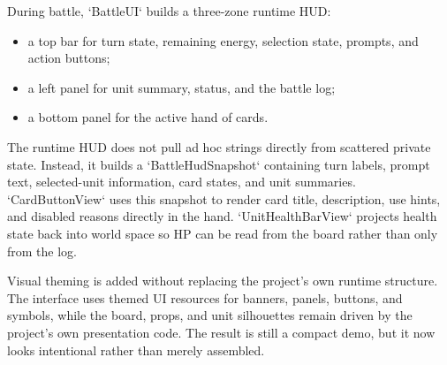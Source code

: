 During battle, `BattleUI` builds a three-zone runtime HUD:

\begin{itemize}
    \item a top bar for turn state, remaining energy, selection state, prompts, and action buttons;
    \item a left panel for unit summary, status, and the battle log;
    \item a bottom panel for the active hand of cards.
\end{itemize}

The runtime HUD does not pull ad hoc strings directly from scattered private state. Instead, it builds a `BattleHudSnapshot` containing turn labels, prompt text, selected-unit information, card states, and unit summaries. `CardButtonView` uses this snapshot to render card title, description, use hints, and disabled reasons directly in the hand. `UnitHealthBarView` projects health state back into world space so HP can be read from the board rather than only from the log.

Visual theming is added without replacing the project's own runtime structure. The interface uses themed UI resources for banners, panels, buttons, and symbols, while the board, props, and unit silhouettes remain driven by the project's own presentation code. The result is still a compact demo, but it now looks intentional rather than merely assembled.
